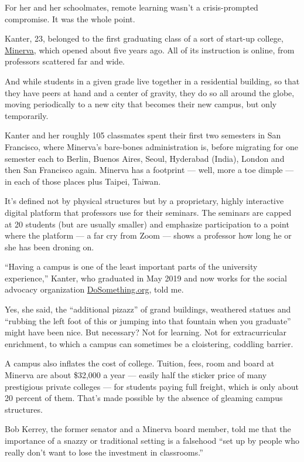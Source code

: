 For her and her schoolmates, remote learning wasn't a crisis-prompted
compromise. It was the whole point.

Kanter, 23, belonged to the first graduating class of a sort of start-up
college,
\href{https://www.minervaproject.com/solutions/educational-solutions/}{Minerva},
which opened about five years ago. All of its instruction is online,
from professors scattered far and wide.

And while students in a given grade live together in a residential
building, so that they have peers at hand and a center of gravity, they
do so all around the globe, moving periodically to a new city that
becomes their new campus, but only temporarily.

Kanter and her roughly 105 classmates spent their first two semesters in
San Francisco, where Minerva's bare-bones administration is, before
migrating for one semester each to Berlin, Buenos Aires, Seoul,
Hyderabad (India), London and then San Francisco again. Minerva has a
footprint --- well, more a toe dimple --- in each of those places plus
Taipei, Taiwan.

It's defined not by physical structures but by a proprietary, highly
interactive digital platform that professors use for their seminars. The
seminars are capped at 20 students (but are usually smaller) and
emphasize participation to a point where the platform --- a far cry from
Zoom --- shows a professor how long he or she has been droning on.

``Having a campus is one of the least important parts of the university
experience,'' Kanter, who graduated in May 2019 and now works for the
social advocacy organization
\href{https://www.dosomething.org/us}{DoSomething.org}, told me.

Yes, she said, the ``additional pizazz'' of grand buildings, weathered
statues and ``rubbing the left foot of this or jumping into that
fountain when you graduate'' might have been nice. But necessary? Not
for learning. Not for extracurricular enrichment, to which a campus can
sometimes be a cloistering, coddling barrier.

A campus also inflates the cost of college. Tuition, fees, room and
board at Minerva are about \$32,000 a year --- easily half the sticker
price of many prestigious private colleges --- for students paying full
freight, which is only about 20 percent of them. That's made possible by
the absence of gleaming campus structures.

Bob Kerrey, the former senator and a Minerva board member, told me that
the importance of a snazzy or traditional setting is a falsehood ``set
up by people who really don't want to lose the investment in
classrooms.''

